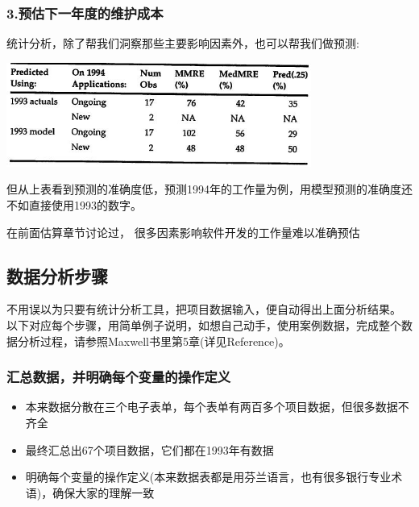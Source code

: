 \hypertarget{ux9884ux4f30ux4e0bux4e00ux5e74ux5ea6ux7684ux7ef4ux62a4ux6210ux672c}{%
\subsubsection{3.预估下一年度的维护成本}\label{ux9884ux4f30ux4e0bux4e00ux5e74ux5ea6ux7684ux7ef4ux62a4ux6210ux672c}}

统计分析，除了帮我们洞察那些主要影响因素外，也可以帮我们做预测:


\includegraphics[width=10cm]{maxwell_t55.jpg}

但从上表看到预测的准确度低，预测1994年的工作量为例，用模型预测的准确度还不如直接使用1993的数字。

在前面估算章节讨论过， 很多因素影响软件开发的工作量难以准确预估

\hypertarget{ux6570ux636eux5206ux6790ux6b65ux9aa4}{%
\subsection{数据分析步骤}\label{ux6570ux636eux5206ux6790ux6b65ux9aa4}}

不用误以为只要有统计分析工具，把项目数据输入，便自动得出上面分析结果。
以下对应每个步骤，用简单例子说明，如想自己动手，使用案例数据，完成整个数据分析过程，请参照Maxwell书里第5章(详见Reference)。

\hypertarget{ux6c47ux603bux6570ux636eux5e76ux660eux786eux6bcfux4e2aux53d8ux91cfux7684ux64cdux4f5cux5b9aux4e49}{%
\subsubsection{汇总数据，并明确每个变量的操作定义}\label{ux6c47ux603bux6570ux636eux5e76ux660eux786eux6bcfux4e2aux53d8ux91cfux7684ux64cdux4f5cux5b9aux4e49}}

\begin{itemize}
\tightlist
\item
  本来数据分散在三个电子表单，每个表单有两百多个项目数据，但很多数据不齐全
\item
  最终汇总出67个项目数据，它们都在1993年有数据
\item
  明确每个变量的操作定义(本来数据表都是用芬兰语言，也有很多银行专业术语)，确保大家的理解一致
\end{itemize}

